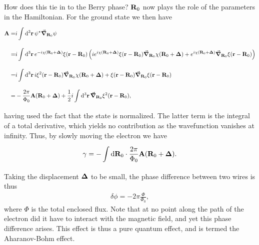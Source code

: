 How does this tie in to the Berry phase? $\vb{R}_{0}$ now plays the role of the parameters in the Hamiltonian. For the ground state we then have
\begin{align*}
\vb{A} =& i\int\limits_{}^{}\dd[3]{\vb{r}}\psi^{\star}\grad_{\vb{R}_{0}}\psi \\
=& i\int\limits_{}^{}\dd[3]{\vb{r}}e^{-i\chi(\vb{R}_{0} + \vb*{\Delta})}\xi(\vb{r} - \vb{R}_{0})\left(ie^{i\chi(\vb{R}_{0} + \vb*{\Delta})}\xi(\vb{r} - \vb{R}_{0})\grad_{\vb{R}_{0}}\chi(\vb{R}_{0} + \vb*{\Delta}) + e^{i\chi(\vb{R}_{0} + \vb*{\Delta})}\grad_{\vb{R}_{0}}\xi(\vb{r} - \vb{R}_{0})\right) \\
=& i\int\limits_{}^{}\dd[3]{\vb{r}}i\xi^{2}(\vb{r} - \vb{R}_{0})\grad_{\vb{R}_{0}}\chi(\vb{R}_{0} + \vb*{\Delta}) + \xi(\vb{r} - \vb{R}_{0})\grad_{\vb{R}_{0}}\xi(\vb{r} - \vb{R}_{0}) \\
=& -\frac{2\pi}{\Phi_{0}}\vb{A}(\vb{R}_{0} + \vb*{\Delta}) + \frac{1}{2}i\int\limits_{}^{}\dd[3]{\vb{r}}\grad_{\vb{R}_{0}}\xi^{2}(\vb{r} - \vb{R}_{0}),
\end{align*}
having used the fact that the state is normalized. The latter term is the integral of a total derivative, which yields no contribution as the wavefunction vanishes at infinity. Thus, by slowly moving the electron we have
\begin{align*}
\gamma = -\int\limits_{}^{}\dd{\vb{R}_{0}}\cdot\frac{2\pi}{\Phi_{0}}\vb{A}(\vb{R}_{0} + \vb*{\Delta}).
\end{align*}
Taking the displacement $\vb*{\Delta}$ to be small, the phase difference between two wires is thus
\begin{align*}
	\delta\phi = -2\pi\frac{\Phi}{\Phi_{0}},
\end{align*}
where $\Phi$ is the total enclosed flux. Note that at no point along the path of the electron did it have to interact with the magnetic field, and yet this phase difference arises. This effect is thus a pure quantum effect, and is termed the Aharanov-Bohm effect.

